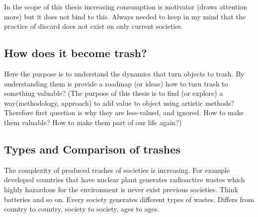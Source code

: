 
In the scope of this thesis increasing consumption is motivator (draws attention more) but it does not bind to this. Always needed to keep in my mind that the practice of discard does not exist on only current societies. 

\subsection{How does it become trash?}
Here the purpose is to understand the dynamics that turn objects to trash. By understanding them is provide a roadmap (or ideas) how to turn trash to something valuable? (The purpose of this thesis is to find (or explore) a way(methodology, approach) to add value to object using artistic methods? Therefore first question is why they are less-valued, and ignored. How to make them valuable? How to make them part of our life again?)

\subsection{Types and Comparison of trashes}
The complexity of produced trashes of societies is increasing. For example developed countries that have nuclear plant generates radioactive wastes which highly hazardous for the environment is never exist previous societies. Think batteries and so on. Every society generates different types of wastes. Differs from country to country, society to society, ages to ages.

